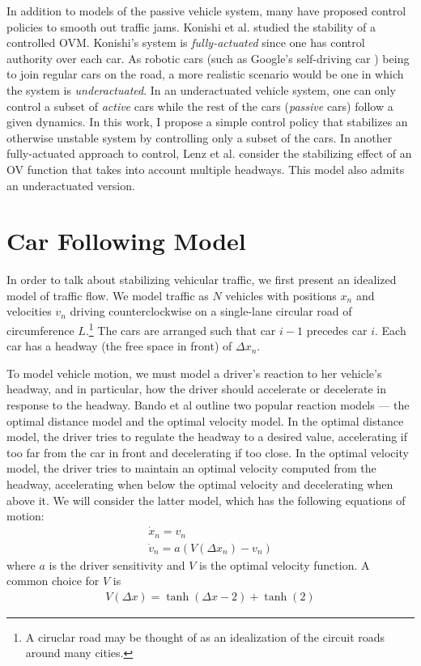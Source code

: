 \documentclass[10pt]{article}
\begin{document}
\begin{multicols}{2}
In addition to models of the passive vehicle system, many have proposed control policies to smooth out traffic jams. Konishi et al. \cite{Konishi} studied the stability of a controlled OVM. Konishi's system is {\em fully-actuated} since one has control authority over each car. As robotic cars (such as Google's self-driving car \cite{Thrun}) being to join regular cars on the road, a more realistic scenario would be one in which the system is {\em underactuated}. In an underactuated vehicle system, one can only control a subset of {\em active} cars while the rest of the cars ({\em passive} cars) follow a given dynamics. In this work, I propose a simple control policy that stabilizes an otherwise unstable system by controlling only a subset of the cars. In another fully-actuated approach to control, Lenz et al. \cite{} consider the stabilizing effect of an OV function that takes into account multiple headways. This model also admits an underactuated version. %

\section{Car Following Model}
In order to talk about stabilizing vehicular traffic, we first present an idealized model of traffic flow. We model traffic as $N$ vehicles with positions $x_n$ and velocities $v_n$ driving counterclockwise on a single-lane circular road of circumference $L$.\footnote{A ciruclar road may be thought of as an idealization of the circuit roads around many cities.} The cars are arranged such that car $i-1$ precedes car $i$. Each car has a headway (the free space in front) of $\Delta x_n$.

To model vehicle motion, we must model a driver's reaction to her vehicle's headway, and in particular, how the driver should accelerate or decelerate in response to the headway. Bando et al \cite{Bando} outline two popular reaction models --- the optimal distance model and the optimal velocity model. In the optimal distance model, the driver tries to regulate the headway to a desired value, accelerating if too far from the car in front and decelerating if too close. In the optimal velocity model, the driver tries to maintain an optimal velocity computed from the headway, accelerating when below the optimal velocity and decelerating when above it. We will consider the latter model, which has the following equations of motion:
\begin{gather}
\label{ovm1} \dot{x}_n = v_n\\
\label{ovm2} \dot{v}_n = a\left(V(\Delta x_n) - v_n\right)
\end{gather}
where $a$ is the driver sensitivity and $V$ is the optimal velocity function. A common choice for $V$ \cite{Bando} is
\begin{gather*}
V(\Delta x)=\tanh(\Delta x - 2) + \tanh(2)
\end{gather*}


\end{multicols}
\end{document}

